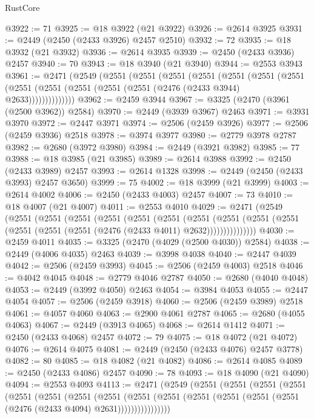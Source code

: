 \begin{lexlean}{RustCore}
\begin{coremodule}
@3922 := 71
@3925 := @18 @3922 (@21 @3922)
@3926 := @2614 @3925
@3931 := @2449 (@2450 (@2433 @3926) @2457 @2510)
@3932 := 72
@3935 := @18 @3932 (@21 @3932)
@3936 := @2614 @3935
@3939 := @2450 (@2433 @3936) @2457
@3940 := 70
@3943 := @18 @3940 (@21 @3940)
@3944 := @2553 @3943
@3961 := @2471
    (@2549
      (@2551
        (@2551
          (@2551
            (@2551
              (@2551
                (@2551
                  (@2551 (@2551 (@2551 (@2551 (@2551 (@2551 (@2476 (@2433 @3944) @2633))))))))))))))
@3962 := @2459 @3944
@3967 := @3325 (@2470 (@3961 (@2500 @3962)) @2584)
@3970 := @2449 (@3939 @3967) @2463
@3971 := @3931 @3970
@3972 := @2447 @3971
@3974 := @2506 (@2459 @3926)
@3977 := @2506 (@2459 @3936) @2518
@3978 := @3974 @3977
@3980 := @2779 @3978 @2787
@3982 := @2680 (@3972 @3980)
@3984 := @2449 (@3921 @3982)
@3985 := 77
@3988 := @18 @3985 (@21 @3985)
@3989 := @2614 @3988
@3992 := @2450 (@2433 @3989) @2457
@3993 := @2614 @1328
@3998 := @2449 (@2450 (@2433 @3993) @2457 @3650)
@3999 := 75
@4002 := @18 @3999 (@21 @3999)
@4003 := @2614 @4002
@4006 := @2450 (@2433 @4003) @2457
@4007 := 73
@4010 := @18 @4007 (@21 @4007)
@4011 := @2553 @4010
@4029 := @2471
    (@2549
      (@2551
        (@2551
          (@2551
            (@2551
              (@2551
                (@2551
                  (@2551
                    (@2551
                      (@2551 (@2551 (@2551 (@2551 (@2551 (@2476 (@2433 @4011) @2632)))))))))))))))
@4030 := @2459 @4011
@4035 := @3325 (@2470 (@4029 (@2500 @4030)) @2584)
@4038 := @2449 (@4006 @4035) @2463
@4039 := @3998 @4038
@4040 := @2447 @4039
@4042 := @2506 (@2459 @3993)
@4045 := @2506 (@2459 @4003) @2518
@4046 := @4042 @4045
@4048 := @2779 @4046 @2787
@4050 := @2680 (@4040 @4048)
@4053 := @2449 (@3992 @4050) @2463
@4054 := @3984 @4053
@4055 := @2447 @4054
@4057 := @2506 (@2459 @3918)
@4060 := @2506 (@2459 @3989) @2518
@4061 := @4057 @4060
@4063 := @2900 @4061 @2787
@4065 := @2680 (@4055 @4063)
@4067 := @2449 (@3913 @4065)
@4068 := @2614 @1412
@4071 := @2450 (@2433 @4068) @2457
@4072 := 79
@4075 := @18 @4072 (@21 @4072)
@4076 := @2614 @4075
@4081 := @2449 (@2450 (@2433 @4076) @2457 @3778)
@4082 := 80
@4085 := @18 @4082 (@21 @4082)
@4086 := @2614 @4085
@4089 := @2450 (@2433 @4086) @2457
@4090 := 78
@4093 := @18 @4090 (@21 @4090)
@4094 := @2553 @4093
@4113 := @2471
    (@2549
      (@2551
        (@2551
          (@2551
            (@2551
              (@2551
                (@2551
                  (@2551
                    (@2551
                      (@2551
                        (@2551
                          (@2551 (@2551 (@2551 (@2551 (@2476 (@2433 @4094) @2631))))))))))))))))

\end{coremodule}
\end{lexlean}
